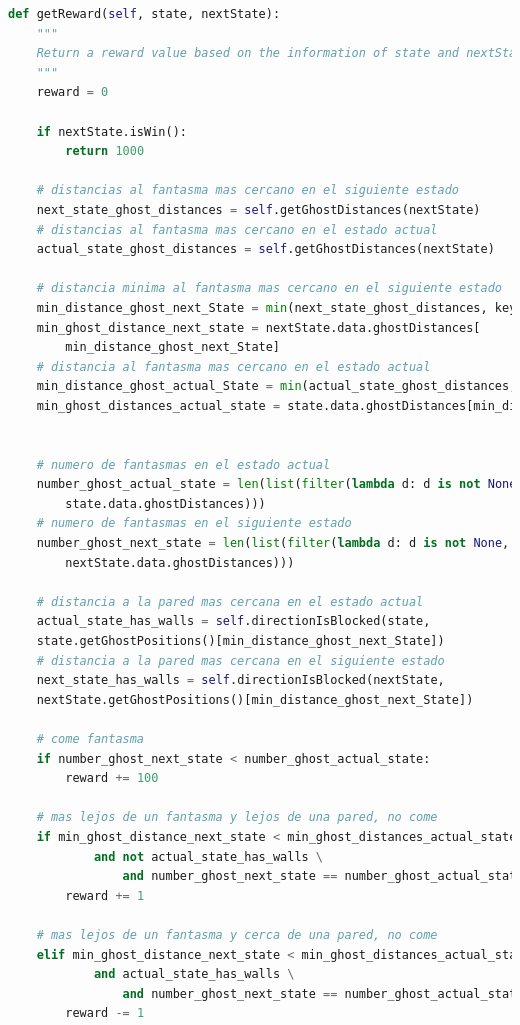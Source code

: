 \documentclass[11pt]{exam}
\begin{document}
\begin{lstlisting}[caption={Función de refuerzo.}, label={reward}, language=python, basicstyle=\scriptsize]
def getReward(self, state, nextState):
	"""
	Return a reward value based on the information of state and nextState
	"""
	reward = 0
	
	if nextState.isWin():
		return 1000
	
	# distancias al fantasma mas cercano en el siguiente estado
	next_state_ghost_distances = self.getGhostDistances(nextState)
	# distancias al fantasma mas cercano en el estado actual
	actual_state_ghost_distances = self.getGhostDistances(nextState)
	
	# distancia minima al fantasma mas cercano en el siguiente estado
	min_distance_ghost_next_State = min(next_state_ghost_distances, key=lambda t: t[1])[0]
	min_ghost_distance_next_state = nextState.data.ghostDistances[
		min_distance_ghost_next_State]
	# distancia al fantasma mas cercano en el estado actual
	min_distance_ghost_actual_State = min(actual_state_ghost_distances, key=lambda t: t[1])[0]
	min_ghost_distances_actual_state = state.data.ghostDistances[min_distance_ghost_actual_State]
	
	
	# numero de fantasmas en el estado actual
	number_ghost_actual_state = len(list(filter(lambda d: d is not None, 
		state.data.ghostDistances)))
	# numero de fantasmas en el siguiente estado
	number_ghost_next_state = len(list(filter(lambda d: d is not None, 
		nextState.data.ghostDistances)))
	
	# distancia a la pared mas cercana en el estado actual
	actual_state_has_walls = self.directionIsBlocked(state,
	state.getGhostPositions()[min_distance_ghost_next_State])
	# distancia a la pared mas cercana en el siguiente estado
	next_state_has_walls = self.directionIsBlocked(nextState,
	nextState.getGhostPositions()[min_distance_ghost_next_State])
	
	# come fantasma
	if number_ghost_next_state < number_ghost_actual_state:
		reward += 100
	
	# mas lejos de un fantasma y lejos de una pared, no come
	if min_ghost_distance_next_state < min_ghost_distances_actual_state \
			and not actual_state_has_walls \
				and number_ghost_next_state == number_ghost_actual_state:
		reward += 1
	
	# mas lejos de un fantasma y cerca de una pared, no come
	elif min_ghost_distance_next_state < min_ghost_distances_actual_state \
			and actual_state_has_walls \
				and number_ghost_next_state == number_ghost_actual_state:
		reward -= 1
	

\end{lstlisting}
\end{document}
